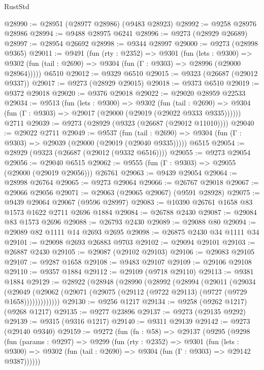 \begin{lexlean}{RustStd}
\begin{coremodule}
{\begin{coremodule}
{{{{{{{{{{{{{{{{{{{{{{{{{{{{{{{{{{{{{{{{{{{{{{{{{{{{{{{@28990 := @28951 (@28977 @28986) (@9483 @28923)
@28992 := @9258 @28976 @28986
@28994 := @9488 @28975 @6241
@28996 := @9273 (@28929 @26689)
@28997 := @28954 @26692
@28998 := @9344 @28997
@29000 := @9273 (@28998 @9365)
@29011 := @9491
    (fun (rty : @2352) =>
    @9301
      (fun (lets : @9300) =>
      @9302 (fun (tail : @2690) => @9304 (fun (Γ : @9303) => @28996 (@29000 @28964)))))
    @6510
@29012 := @9329 @6510
@29015 := @9323 (@26687 (@29012 @9337))
@29017 := @9273 (@28929 @29015)
@29018 := @9373 @6510
@29019 := @9372 @29018
@29020 := @9376 @29018
@29022 := @29020 @28959 @22533
@29034 := @9513
    (fun (lets : @9300) =>
    @9302
      (fun (tail : @2690) =>
      @9304 (fun (Γ : @9303) => @29017 (@29000 (@29019 (@29022 @9333 @9335))))))
    @2711
@29039 := @9273 (@28929 (@9323 (@26687 (@29012 @11010))))
@29040 := @29022 @2711
@29049 := @9537
    (fun (tail : @2690) => @9304 (fun (Γ : @9303) => @29039 (@29000 (@29019 (@29040 @9335)))))
    @6515
@29054 := @28929 (@9323 (@26687 (@29012 (@9332 @6516))))
@29055 := @9273 @29054
@29056 := @29040 @6515
@29062 := @9555 (fun (Γ : @9303) => @29055 (@29000 (@29019 @29056))) @26761
@29063 := @9439 @29054
@29064 := @28998 @26764
@29065 := @9273 @29064
@29066 := @26767 @29018
@29067 := @29066 @29056
@29071 := @29063 (@29065 @29067) (@9591 @28928)
@29075 := @9439 @29064 @29067 (@9596 @28997)
@29083 := @10390 @26761 @1658 @83 @1573 @1622 @2711 @2696 @1884
@29084 := @26788 @2430
@29087 := @29084 @83 @1573 @2696
@29088 := @26793 @2430
@29089 := @29088 @80
@29094 := @29089 @82 @1111 @14 @2693 @2695
@29098 := @26875 @2430 @34 @1111 @34
@29101 := @29098 @2693 @26883 @9703
@29102 := @29094 @29101
@29103 := @26887 @2430
@29105 := @29087 (@29102 @29103)
@29106 := @29083 @29105
@29107 := @9287 @1658
@29108 := @9483 @29107
@29109 := @29106 @29108
@29110 := @9357 @1884
@29112 := @29109 (@9718 @29110)
@29113 := @9381 @1884
@29129 := @28922
    (@28948
      (@28990
        (@28992
          (@28994
            (@29011
              (@29034
                (@29049
                  (@29062 (@29071 (@29075 (@29112 (@9722 @29113) (@9727 (@9729 @1658)))))))))))))
@29130 := @9256 @1217
@29134 := @9258 (@9262 @1217) (@9268 @1217)
@29135 := @9277 @23896
@29137 := @9273 (@29135 @9292)
@29139 := @9315 (@9316 @1217)
@29140 := @9311 @29139
@29142 := @9273 (@29140 @9340)
@29159 := @9272
    (fun (fn : @58) =>
    @29137
      (@9295
        (@9298
          (fun (params : @9297) =>
          @9299
            (fun (rty : @2352) =>
            @9301
              (fun (lets : @9300) =>
              @9302 (fun (tail : @2690) => @9304 (fun (Γ : @9303) => @29142 @9387))))))
}}}}}}}}}}}}}}}}}}}}}}}}}}}}}}}}}}}}}}}}}}}}}}}}}}}}}}}
\end{coremodule}}
\end{coremodule}
\end{lexlean}
